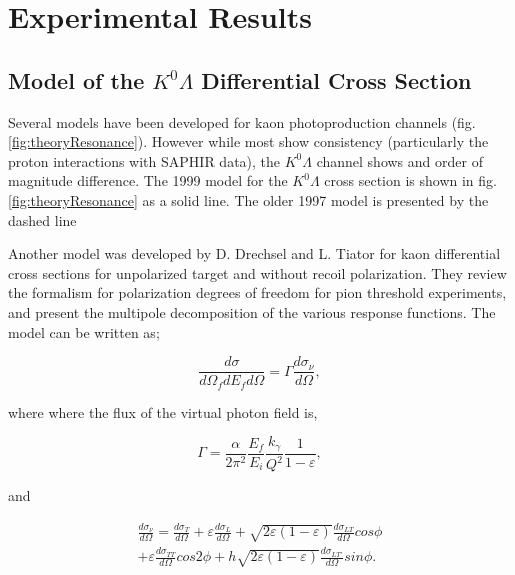 \documentclass[prb,10pt,twocolumn,tightenlines,superscriptaddress]{revtex4-1}
\begin{document}

\section{Experimental Results}
\subsection{Model of the $K^{0}\Lambda$ Differential Cross Section}
Several models have been developed for kaon photoproduction channels (fig. \ref{fig:theoryResonance}). However while most show consistency (particularly the proton interactions with SAPHIR data), the $K^{0}\Lambda$ channel shows and order of magnitude difference. The 1999 model for the $K^{0}\Lambda$ cross section is shown in fig. \ref{fig:theoryResonance} as a solid line. The older 1997 model is presented by the dashed line\cite{bib:model2}

Another model was developed by D. Drechsel and L. Tiator for kaon differential cross sections for unpolarized target and without recoil polarization\cite{bib:XSectionTheory}. They review the formalism for polarization degrees of freedom for pion threshold experiments, and present the multipole decomposition of the various response functions. The model can be written as;

\vspace{5mm} %
\begin{equation} 
\frac{d\sigma}{d\Omega_{f}dE_{f}d\Omega}=\Gamma \frac{d\sigma_{\nu}}{d\Omega},
\label{EQ4} 
\end{equation} 
\vspace{5mm} %

where where the flux of the virtual photon field is, 

\vspace{5mm} %
\begin{equation} 
\Gamma = \frac{\alpha }{2\pi^{2}}\frac{E_{f}}{E_{i}}\frac{k_{\gamma}}{Q^{2}}\frac{1}{1-\varepsilon},
\label{EQ5} 
\end{equation} 
\vspace{5mm} %

and

\vspace{5mm} %
\begin{equation} 
\begin{split}
\frac{d\sigma_{\nu}}{d\Omega}= \frac{d\sigma_{T}}{d\Omega} + \varepsilon \frac{d\sigma_{L}}{d\Omega} + \sqrt{2\varepsilon\left ( 1 - \varepsilon \right )}\frac{d\sigma_{LT}}{d\Omega}cos\phi  \\  
+ \varepsilon \frac{d\sigma_{TT}}{d\Omega}cos2\phi  + h \sqrt{2\varepsilon\left ( 1 - \varepsilon \right )}\frac{d\sigma_{LT'}}{d\Omega}sin\phi.
\label{EQ6}  
\end{split}                                                
\end{equation} 
\vspace{5mm} %
\end{document}
